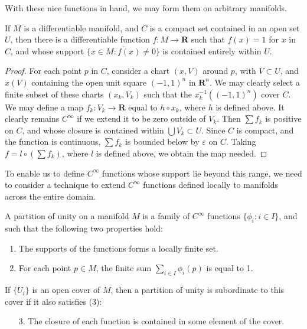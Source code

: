 With these nice functions in hand, we may form them on arbitrary manifolds.

\begin{theorem}
    If $M$ is a differentiable manifold, and $C$ is a compact set contained in an open set $U$, then there is a differentiable function $f:M \to \mathbf{R}$ such that $f(x) = 1$ for $x$ in $C$, and whose support $\overline{\{ x \in M : f(x) \neq 0 \}}$ is contained entirely within $U$.
\end{theorem}
\begin{proof}
    For each point $p$ in $C$, consider a chart $(x,V)$ around $p$, with $\overline{V} \subset U$, and $x(V)$ containing the open unit square $(-1,1)^n$ in $\mathbf{R}^n$. We may clearly select a finite subset of these charts $(x_k,V_k)$ such that the $x_k^{-1}((-1,1)^n)$ cover $C$. We may define a map $f_k:V_k \to \mathbf{R}$ equal to $h \circ x_k$, where $h$ is defined above. It clearly remains $C^\infty$ if we extend it to be zero outside of $V_k$. Then $\sum f_k$ is positive on $C$, and whose closure is contained within $\bigcup \overline{V_k} \subset U$. Since $C$ is compact, and the function is continuous, $\sum f_k$ is bounded below by $\varepsilon$ on $C$. Taking $f = l \circ (\sum f_k)$, where $l$ is defined above, we obtain the map needed.
\end{proof}

To enable us to define $C^\infty$ functions whose support lie beyond this range, we need to consider a technique to extend $C^\infty$ functions defined locally to manifolds across the entire domain.

\begin{definition}
    A partition of unity on a manifold $M$ is a family of $C^\infty$ functions $\{ \phi_i : i \in I \}$, and such that the following two properties hold:
    \begin{enumerate}
        \item The supports of the functions forms a locally finite set.
        \item For each point $p \in M$, the finite sum $\sum_{i \in I} \phi_i(p)$ is equal to 1.
    \end{enumerate}
    If $\{ U_i \}$ is an open cover of $M$, then a partition of unity is subordinate to this cover if it also satisfies (3):
    \begin{enumerate}
        \item[3.] The closure of each function is contained in some element of the cover.
    \end{enumerate}
\end{definition}

